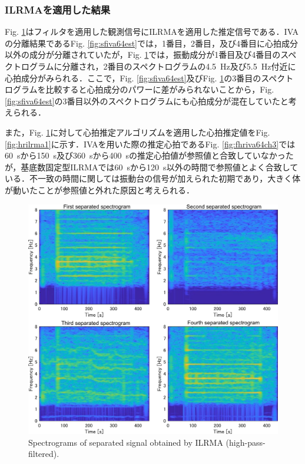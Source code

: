 \documentclass[10.5pt]{jarticle}
\begin{document}
\subsubsection{ILRMAを適用した結果}
\hspace{1.0em}Fig. \ref{fig:silrma1}はフィルタを適用した観測信号にILRMAを適用した推定信号である．IVAの分離結果であるFig. \ref{fig:sfiva64est}では，1番目，2番目，及び4番目に心拍成分以外の成分が分離されていたが，Fig. \ref{fig:silrma1}では，振動成分が1番目及び4番目のスペクトログラムに分離され，2番目のスペクトログラムの4.5~Hz及び5.5~Hz付近に心拍成分がみられる．ここで，Fig. \ref{fig:sfiva64est}及びFig. \ref{fig:silrma1}の3番目のスペクトログラムを比較すると心拍成分のパワーに差がみられないことから，Fig. \ref{fig:sfiva64est}の3番目以外のスペクトログラムにも心拍成分が混在していたと考えられる．

また，Fig. \ref{fig:silrma1}に対して心拍推定アルゴリズムを適用した心拍推定値をFig. \ref{fig:hrilrma1}に示す．IVAを用いた際の推定心拍であるFig. \ref{fig:fhriva64ch3}では60~sから150~s及び360~sから400~sの推定心拍値が参照値と合致していなかったが，基底数固定型ILRMAでは60~sから120~s以外の時間で参照値とよく合致している．不一致の時間に関しては振動台の信号が加えられた初期であり，大きく体が動いたことが参照値と外れた原因と考えられる．

\begin{figure}[tb]
\centering
\includegraphics[width=1.0\hsize]{spect_ILRMA1_64_est.pdf}
\vspace{-20pt} %
\caption{Spectrograms of separated signal obtained by ILRMA (high-pass-filtered).}
\vspace{-20pt} %
\label{fig:silrma1}
\end{figure}
\end{document}

